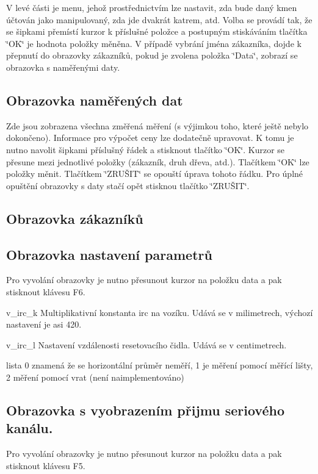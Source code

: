 V levé části je menu, jehož prostřednictvím lze nastavit, zda bude daný kmen účtován jako manipulovaný, zda jde dvakrát katrem, atd. Volba se provádí tak, že se šipkami přemístí kurzor k příslušné položce a postupným stiskáváním tlačítka \char`\"{}OK\char`\"{} je hodnota položky měněna. V případě vybrání jména zákazníka, dojde k přepnutí do obrazovky zákazníků, pokud je zvolena položka \char`\"{}Data\char`\"{}, zobrazí se obrazovka s naměřenými daty.\subsection{Obrazovka naměřených dat}\label{Manual_obrazovka_data}
Zde jsou zobrazena všechna změřená měření (s výjimkou toho, které ještě nebylo dokončeno). Informace pro výpočet ceny lze dodatečně upravovat. K tomu je nutno navolit šipkami příslušný řádek a stisknout tlačítko \char`\"{}OK\char`\"{}. Kurzor se přesune mezi jednotlivé položky (zákazník, druh dřeva, atd.). Tlačítkem \char`\"{}OK\char`\"{} lze položky měnit. Tlačítkem \char`\"{}ZRUŠIT\char`\"{} se opouští úprava tohoto řádku. Pro úplné opuštění obrazovky s daty stačí opět stisknou tlačítko \char`\"{}ZRUŠIT\char`\"{}.\subsection{Obrazovka zákazníků}\label{Manual_obrazovka_zakaznici}
\subsection{Obrazovka nastavení parametrů}\label{Manual_obrazovka_setup}
Pro vyvolání obrazovky je nutno přesunout kurzor na položku data a pak stisknout klávesu F6.

v\_\-irc\_\-k Multiplikativní konstanta irc na vozíku. Udává se v milimetrech, výchozí nastavení je asi 420.

v\_\-irc\_\-l Nastavení vzdálenosti resetovacího čidla. Udává se v centimetrech.

lista 0 znamená že se horizontální průměr neměří, 1 je měření pomocí měřící lišty, 2 měření pomocí vrat (není naimplementováno)\subsection{Obrazovka s vyobrazením přijmu seriového kanálu.}\label{Manual_obrazovka_serial}
Pro vyvolání obrazovky je nutno přesunout kurzor na položku data a pak stisknout klávesu F5.

 